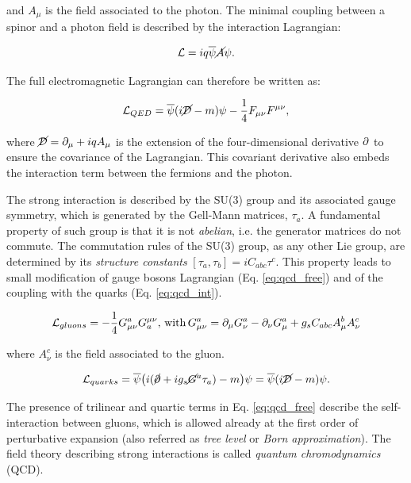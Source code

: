 and $A_{\mu}$ is the field associated to the photon.
The minimal coupling between a spinor and a photon field is described by the interaction Lagrangian:

\begin{equation}
\mathcal{L} = iq \overline{\psi} \cancel{A} \psi.
\end{equation}

The full electromagnetic Lagrangian can therefore be written as:

\begin{equation}
\mathcal{L}_{QED} = \overline{\psi}(i\cancel{\mathcal{D}} - m)\psi - \dfrac{1}{4} F_{\mu\nu} F^{\mu\nu},
\end{equation}

where $\cancel{\mathcal{D}} = \partial_\mu + i q A_\mu$ is the extension of the four-dimensional derivative $\partial$ to ensure the covariance of the Lagrangian. This covariant derivative also embeds the interaction term between the fermions and the photon.

The strong interaction is described by the SU(3) group and its associated gauge symmetry, which is generated by the Gell-Mann matrices, $\tau_a$. A fundamental property of such group is that it is not \emph{abelian}, i.e. the generator matrices do not commute. The commutation rules of the SU(3) group, as any other Lie group, are determined by its \emph{structure constants} $[\tau_a, \tau_b] = i C_{abc} \tau^c$. This property leads to small modification of gauge bosons Lagrangian (Eq. \ref{eq:qcd_free}) and of the coupling with the quarks (Eq. \ref{eq:qcd_int}).

\begin{equation}
\mathcal{L}_{gluons} = - \dfrac{1}{4} G^{a}_{\mu\nu}  G_{a}^{\mu\nu}, \, \mathrm{with} \, G^{a}_{\mu\nu} = \partial_\mu G^a_\nu - \partial_\nu G^a_\mu + g_s C_{abc} A^b_\mu A^c_\nu
\label{eq:qcd_free}
\end{equation}

where $A^c_\nu$ is the field associated to the gluon.

\begin{equation}
\mathcal{L}_{quarks} = \overline{\psi} \big( i (\cancel{\partial} + i g_s \cancel{G}^a \tau_a) - m \big) \psi = \overline{\psi} ( i \cancel{\mathcal{D}} - m ) \psi.
\label{eq:qcd_int}
\end{equation}

The presence of trilinear and quartic terms in Eq. \ref{eq:qcd_free} describe the self-interaction between gluons, which is allowed already at the first order of perturbative expansion (also referred as \emph{tree level} or \emph{Born approximation}). The field theory describing strong interactions is called \emph{quantum chromodynamics} (QCD).

